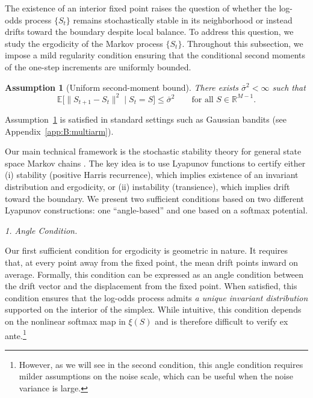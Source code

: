 \documentclass[12pt]{article}
\newtheorem{assumption}{Assumption}
\newcommand{\E}{\mathbb{E}}
\begin{document}
\vspace{0.5em}

The existence of an interior fixed point raises the question of whether the log-odds process $\{S_t\}$ remains stochastically stable in its neighborhood or instead drifts toward the boundary despite local balance.
To address this question, we study the ergodicity of the Markov process $\{S_t\}$.
Throughout this subsection, we impose a mild regularity condition ensuring that the conditional second moments of the one-step increments are uniformly bounded.

\begin{assumption}[Uniform second-moment bound]\label{assumption:uniform-second-moment-bound}
There exists $\bar\sigma^2<\infty$ such that
\[
\E\!\big[\|S_{t+1}-S_t\|^2\mid S_t=S\big]\le \bar\sigma^2\qquad\text{for all }S\in\mathbb{R}^{M-1}.
\]
\end{assumption}

Assumption~\ref{assumption:uniform-second-moment-bound} is satisfied in standard settings such as Gaussian bandits (see Appendix~\ref{app:B:multiarm}).

Our main technical framework is the stochastic stability theory for general state space Markov chains \citep{meynMarkovChainsStochastic1993}.
The key idea is to use Lyapunov functions to certify either (i) stability (positive Harris recurrence), which implies existence of an invariant distribution and ergodicity, or (ii) instability (transience), which implies drift toward the boundary.
We present two sufficient conditions based on two different Lyapunov constructions: one “angle-based” and one based on a softmax potential.

\vspace{1em}
\textit{1. Angle Condition.}


Our first sufficient condition for ergodicity is geometric in nature.
It requires that, at every point away from the fixed point, the mean drift points inward on average.
Formally, this condition can be expressed as an angle condition between the drift vector and the displacement from the fixed point.
When satisfied, this condition ensures that the log-odds process admits \textit{a unique invariant distribution} supported on the interior of the simplex. While intuitive, this condition depends on the nonlinear softmax map in $\xi(S)$ and is therefore difficult to verify ex ante.\footnote{However, as we will see in the second condition, this angle condition requires milder assumptions on the noise scale, which can be useful when the noise variance is large. }
\end{document}
